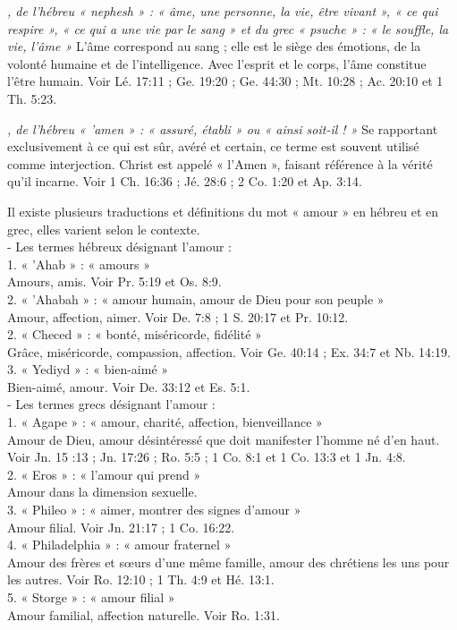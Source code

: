 \begin{multicols}{2}
{\textit{, de l'hébreu « nephesh » : « âme, une personne, la vie, être vivant », « ce qui respire », « ce qui a une vie par le sang » et du grec « psuche » : « le souffle, la vie, l'âme »}\newline
L'âme correspond au sang ; elle est le siège des émotions, de la volonté humaine et de l'intelligence. Avec l'esprit et le corps, l'âme constitue l'être humain. Voir Lé. 17:11 ; Ge. 19:20 ; Ge. 44:30 ; Mt. 10:28 ; Ac. 20:10 et 1 Th. 5:23.

\textit{, de l'hébreu « 'amen » : « assuré, établi » ou « ainsi soit-il ! »}\newline
Se rapportant exclusivement à ce qui est sûr, avéré et certain, ce terme est souvent utilisé comme interjection. Christ est appelé « l'Amen », faisant référence à la vérité qu'il incarne. Voir 1 Ch. 16:36 ; Jé. 28:6 ; 2 Co. 1:20 et Ap. 3:14.

\textit{}\newline
Il existe plusieurs traductions et définitions du mot « amour » en hébreu et en grec, elles varient selon le contexte.
\\- Les termes hébreux désignant l'amour :
\\1. « 'Ahab » : « amours »
\\Amours, amis. Voir Pr. 5:19 et Os. 8:9.
\\2. « 'Ahabah » : « amour humain, amour de Dieu pour son peuple »
\\Amour, affection, aimer. Voir De. 7:8 ; 1 S. 20:17 et Pr. 10:12.
\\2. « Checed » : « bonté, miséricorde, fidélité »
\\Grâce, miséricorde, compassion, affection. Voir Ge. 40:14 ; Ex. 34:7 et Nb. 14:19.
\\3. « Yediyd » : « bien-aimé »
\\Bien-aimé, amour. Voir De. 33:12 et Es. 5:1.
\\- Les termes grecs désignant l'amour :
\\1. « Agape » : « amour, charité, affection, bienveillance »
\\Amour de Dieu, amour désintéressé que doit manifester l'homme né d'en haut. Voir Jn. 15 :13 ; Jn. 17:26 ; Ro. 5:5 ; 1 Co. 8:1 et 1 Co. 13:3 et 1 Jn. 4:8.
\\2. « Eros » : « l'amour qui prend »
\\Amour dans la dimension sexuelle.
\\3. « Phileo » : « aimer, montrer des signes d'amour »
\\Amour filial. Voir Jn. 21:17 ; 1 Co. 16:22.
\\4. « Philadelphia » : « amour fraternel »
\\Amour des frères et sœurs d'une même famille, amour des chrétiens les uns pour les autres. Voir Ro. 12:10 ; 1 Th. 4:9 et Hé. 13:1.
\\5. « Storge » : « amour filial »
\\Amour familial, affection naturelle. Voir Ro. 1:31.

}
\end{multicols}
